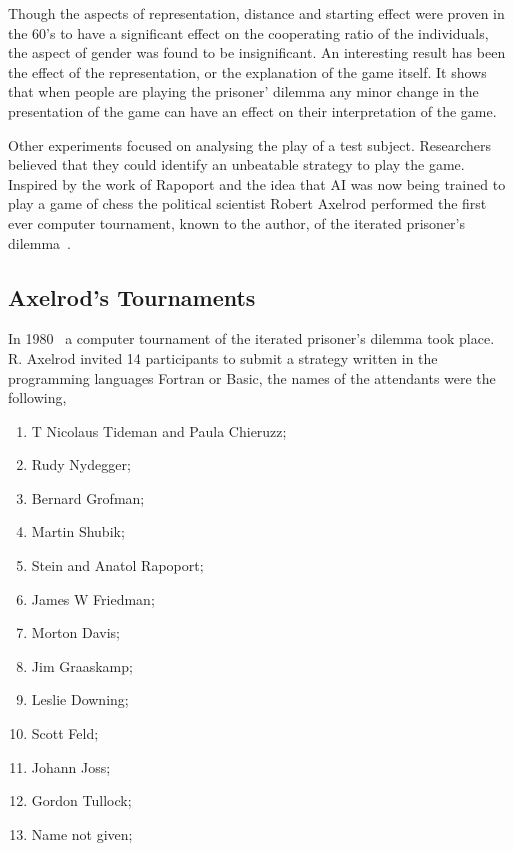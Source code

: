 \documentclass{article}
\begin{document}
Though the aspects of representation, distance and starting effect were proven 
in the 60's to have a significant effect on the cooperating ratio of the 
individuals, the aspect of gender was found to be insignificant. An interesting
result has been the effect of the representation, or the  explanation of the game 
itself. It shows that when people are playing the prisoner' dilemma 
any minor change in the presentation of the game can have an effect on their
interpretation of the game. 

Other experiments focused on analysing the play of a test subject. Researchers believed
that they could identify an unbeatable strategy to play the game. Inspired by 
the work of Rapoport and the idea that AI was now being trained to play a 
game of chess the political scientist Robert Axelrod performed
the first ever computer tournament, known to the author, of the iterated 
prisoner's dilemma~\cite{axelrod2012, Axelrod1981}.

\subsection{Axelrod's Tournaments}\label{subsection:axelrods_tournament}

In 1980~\cite{axelrod1980a} a computer tournament of the iterated prisoner's
dilemma took place. R. Axelrod invited 14 participants to submit a strategy written
in the programming languages Fortran or Basic, the names of the attendants were
the following,

\begin{multicols}{2}
    \begin{enumerate}
        \item T Nicolaus Tideman and Paula Chieruzz;
        \item Rudy Nydegger;
        \item Bernard Grofman;
        \item Martin Shubik;
        \item Stein and Anatol Rapoport;
        \item James W Friedman;
        \item Morton Davis;
        \item Jim Graaskamp;
        \item Leslie Downing;
        \item Scott Feld;
        \item Johann Joss;
        \item Gordon Tullock;
        \item Name not given;
    \end{enumerate}
\end{multicols}
\end{document}
